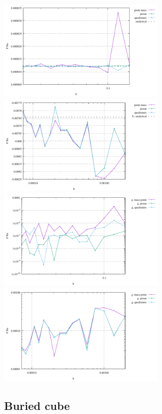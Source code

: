 \begin{center}
\includegraphics[width=8cm]{python_codes/fieldstone_84/sphere/single_point_g.pdf}
\includegraphics[width=8cm]{python_codes/fieldstone_84/sphere/single_point_U.pdf}\\
\includegraphics[width=8cm]{python_codes/fieldstone_84/sphere/single_point_g_error.pdf}
\includegraphics[width=8cm]{python_codes/fieldstone_84/sphere/single_point_U_error.pdf}
\end{center}


\newpage
\subsection*{Buried cube}


